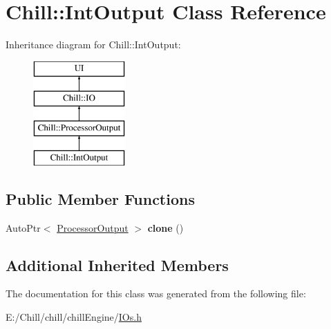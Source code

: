 \hypertarget{class_chill_1_1_int_output}{}\section{Chill\+:\+:Int\+Output Class Reference}
\label{class_chill_1_1_int_output}
Inheritance diagram for Chill\+:\+:Int\+Output\+:\begin{figure}[H]
\begin{center}
\leavevmode
\includegraphics[height=4.000000cm]{class_chill_1_1_int_output}
\end{center}
\end{figure}
\subsection*{Public Member Functions}
\begin{DoxyCompactItemize}
\item 
\mbox{\label{class_chill_1_1_int_output_a40398ba114010bc4d7f585f4da8cddd9}} 
Auto\+Ptr$<$ \mbox{\hyperlink{class_chill_1_1_processor_output}{Processor\+Output}} $>$ {\bfseries clone} ()
\end{DoxyCompactItemize}
\subsection*{Additional Inherited Members}


The documentation for this class was generated from the following file\+:\begin{DoxyCompactItemize}
\item 
E\+:/\+Chill/chill/chill\+Engine/\mbox{\hyperlink{_i_os_8h}{I\+Os.\+h}}\end{DoxyCompactItemize}
